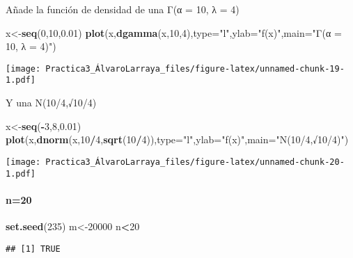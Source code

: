 \documentclass[
]{article}
\newenvironment{Shaded}{\begin{snugshade}}{\end{snugshade}}
\newcommand{\DataTypeTok}[1]{\textcolor[rgb]{0.13,0.29,0.53}{#1}}
\newcommand{\DecValTok}[1]{\textcolor[rgb]{0.00,0.00,0.81}{#1}}
\newcommand{\FloatTok}[1]{\textcolor[rgb]{0.00,0.00,0.81}{#1}}
\newcommand{\KeywordTok}[1]{\textcolor[rgb]{0.13,0.29,0.53}{\textbf{#1}}}
\newcommand{\NormalTok}[1]{#1}
\newcommand{\OperatorTok}[1]{\textcolor[rgb]{0.81,0.36,0.00}{\textbf{#1}}}
\newcommand{\StringTok}[1]{\textcolor[rgb]{0.31,0.60,0.02}{#1}}
\begin{document}
Añade la función de densidad de una Γ(α = 10, λ = 4)

\begin{Shaded}
\begin{Highlighting}[]
\NormalTok{x<-}\KeywordTok{seq}\NormalTok{(}\DecValTok{0}\NormalTok{,}\DecValTok{10}\NormalTok{,}\FloatTok{0.01}\NormalTok{)}
\KeywordTok{plot}\NormalTok{(x,}\KeywordTok{dgamma}\NormalTok{(x,}\DecValTok{10}\NormalTok{,}\DecValTok{4}\NormalTok{),}\DataTypeTok{type=}\StringTok{"l"}\NormalTok{,}\DataTypeTok{ylab=}\StringTok{"f(x)"}\NormalTok{,}\DataTypeTok{main=}\StringTok{"Γ(α = 10, λ = 4)"}\NormalTok{)}
\end{Highlighting}
\end{Shaded}

\texttt{[image: Practica3\_ÁlvaroLarraya\_files/figure-latex/unnamed-chunk-19-1.pdf]}

Y una N(10/4,√10/4)

\begin{Shaded}
\begin{Highlighting}[]
\NormalTok{x<-}\KeywordTok{seq}\NormalTok{(}\OperatorTok{-}\DecValTok{3}\NormalTok{,}\DecValTok{8}\NormalTok{,}\FloatTok{0.01}\NormalTok{)}
\KeywordTok{plot}\NormalTok{(x,}\KeywordTok{dnorm}\NormalTok{(x,}\DecValTok{10}\OperatorTok{/}\DecValTok{4}\NormalTok{,}\KeywordTok{sqrt}\NormalTok{(}\DecValTok{10}\OperatorTok{/}\DecValTok{4}\NormalTok{)),}\DataTypeTok{type=}\StringTok{"l"}\NormalTok{,}\DataTypeTok{ylab=}\StringTok{"f(x)"}\NormalTok{,}\DataTypeTok{main=}\StringTok{"N(10/4,√10/4)"}\NormalTok{)}
\end{Highlighting}
\end{Shaded}

\texttt{[image: Practica3\_ÁlvaroLarraya\_files/figure-latex/unnamed-chunk-20-1.pdf]}

\hypertarget{n20}{%
\paragraph{n=20}\label{n20}}

\begin{Shaded}
\begin{Highlighting}[]
\KeywordTok{set.seed}\NormalTok{(}\DecValTok{235}\NormalTok{)}
\NormalTok{m<-}\DecValTok{20000}
\NormalTok{n}\OperatorTok{<}\DecValTok{20}
\end{Highlighting}
\end{Shaded}

\begin{verbatim}
## [1] TRUE
\end{verbatim}
\end{document}
